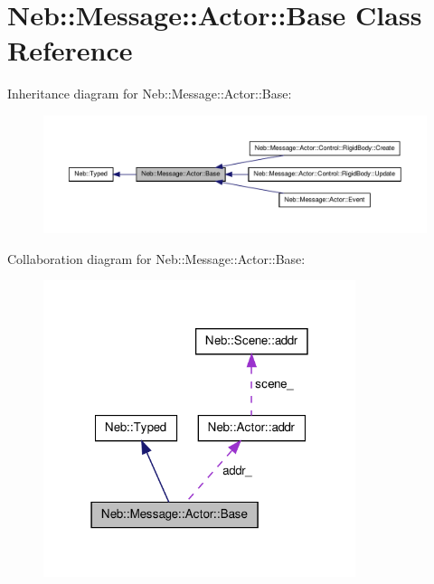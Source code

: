 \hypertarget{classNeb_1_1Message_1_1Actor_1_1Base}{\section{\-Neb\-:\-:\-Message\-:\-:\-Actor\-:\-:\-Base \-Class \-Reference}
\label{classNeb_1_1Message_1_1Actor_1_1Base}
}


\-Inheritance diagram for \-Neb\-:\-:\-Message\-:\-:\-Actor\-:\-:\-Base\-:
\nopagebreak
\begin{figure}[H]
\begin{center}
\leavevmode
\includegraphics[width=350pt]{classNeb_1_1Message_1_1Actor_1_1Base__inherit__graph}
\end{center}
\end{figure}


\-Collaboration diagram for \-Neb\-:\-:\-Message\-:\-:\-Actor\-:\-:\-Base\-:
\nopagebreak
\begin{figure}[H]
\begin{center}
\leavevmode
\includegraphics[width=259pt]{classNeb_1_1Message_1_1Actor_1_1Base__coll__graph}
\end{center}
\end{figure}

